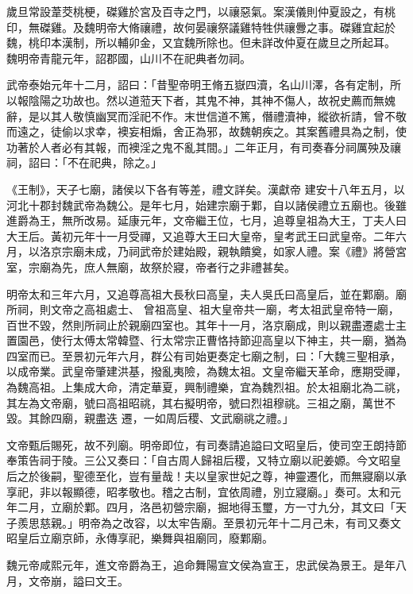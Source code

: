 \begin{pinyinscope}
 歲旦常設葦茭桃梗，磔雞於宮及百寺之門，以禳惡氣。案漢儀則仲夏設之，有桃印，無磔雞。及魏明帝大脩禳禮，故何晏禳祭議雞特牲供禳釁之事。磔雞宜起於魏，桃印本漢制，所以輔卯金，又宜魏所除也。但未詳改仲夏在歲旦之所起耳。
 魏明帝青龍元年，詔郡國，山川不在祀典者勿祠。



 武帝泰始元年十二月，詔曰：「昔聖帝明王脩五嶽四瀆，名山川澤，各有定制，所以報陰陽之功故也。然以道蒞天下者，其鬼不神，其神不傷人，故祝史薦而無媿辭，是以其人敬慎幽冥而淫祀不作。末世信道不篤，僭禮瀆神，縱欲祈請，曾不敬而遠之，徒偷以求幸，襖妄相煽，舍正為邪，故魏朝疾之。其案舊禮具為之制，使功著於人者必有其報，而襖淫之鬼不亂其間。」二年正月，有司奏春分祠厲殃及禳祠，詔曰：「不在祀典，除之。」



 《王制》，天子七廟，諸侯以下各有等差，禮文詳矣。漢獻帝
 建安十八年五月，以河北十郡封魏武帝為魏公。是年七月，始建宗廟于鄴，自以諸侯禮立五廟也。後雖進爵為王，無所改易。延康元年，文帝繼王位，七月，追尊皇祖為大王，丁夫人曰大王后。黃初元年十一月受禪，又追尊大王曰大皇帝，皇考武王曰武皇帝。二年六月，以洛京宗廟未成，乃祠武帝於建始殿，親執饋奠，如家人禮。案《禮》將營宮室，宗廟為先，庶人無廟，故祭於寢，帝者行之非禮甚矣。



 明帝太和三年六月，又追尊高祖大長秋曰高皇，夫人吳氏曰高皇后，並在鄴廟。廟所祠，則文帝之高祖處士、
 曾祖高皇、祖大皇帝共一廟，考太祖武皇帝特一廟，百世不毀，然則所祠止於親廟四室也。其年十一月，洛京廟成，則以親盡遷處士主置園邑，使行太傅太常韓暨、行太常宗正曹恪持節迎高皇以下神主，共一廟，猶為四室而已。至景初元年六月，群公有司始更奏定七廟之制，曰：「大魏三聖相承，以成帝業。武皇帝肇建洪基，撥亂夷險，為魏太祖。文皇帝繼天革命，應期受禪，為魏高祖。上集成大命，清定華夏，興制禮樂，宜為魏烈祖。於太祖廟北為二祧，其左為文帝廟，號曰高祖昭祧，其右擬明帝，號曰烈祖穆祧。三祖之廟，萬世不毀。其餘四廟，親盡迭
 遷，一如周后稷、文武廟祧之禮。」



 文帝甄后賜死，故不列廟。明帝即位，有司奏請追謚曰文昭皇后，使司空王朗持節奉策告祠于陵。三公又奏曰：「自古周人歸祖后稷，又特立廟以祀姜嫄。今文昭皇后之於後嗣，聖德至化，豈有量哉！夫以皇家世妃之尊，神靈遷化，而無寢廟以承享祀，非以報顯德，昭孝敬也。稽之古制，宜依周禮，別立寢廟。」奏可。太和元年二月，立廟於鄴。四月，洛邑初營宗廟，掘地得玉璽，方一寸九分，其文曰「天子羨思慈親。」明帝為之改容，以太牢告廟。至景初元年十二月己未，有司又奏文
 昭皇后立廟京師，永傳享祀，樂舞與祖廟同，廢鄴廟。



 魏元帝咸熙元年，進文帝爵為王，追命舞陽宣文侯為宣王，忠武侯為景王。是年八月，文帝崩，謚曰文王。




\end{pinyinscope}
